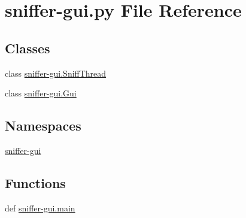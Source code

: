\hypertarget{sniffer-gui_8py}{\section{sniffer-\/gui.py File Reference}
\label{sniffer-gui_8py}
}
\subsection*{Classes}
\begin{DoxyCompactItemize}
\item 
class \hyperlink{classsniffer-gui_1_1SniffThread}{sniffer-\/gui.\-Sniff\-Thread}
\item 
class \hyperlink{classsniffer-gui_1_1Gui}{sniffer-\/gui.\-Gui}
\end{DoxyCompactItemize}
\subsection*{Namespaces}
\begin{DoxyCompactItemize}
\item 
\hyperlink{namespacesniffer-gui}{sniffer-\/gui}
\end{DoxyCompactItemize}
\subsection*{Functions}
\begin{DoxyCompactItemize}
\item 
def \hyperlink{namespacesniffer-gui_a2d3837d4b7f42dbdeefbeacde215b6fb}{sniffer-\/gui.\-main}
\end{DoxyCompactItemize}
